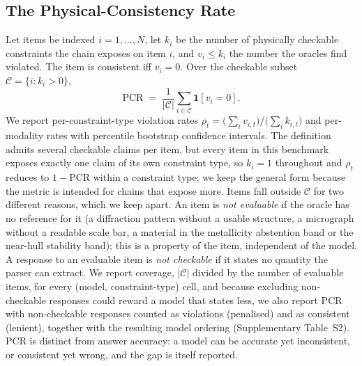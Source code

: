 \documentclass[pdflatex,sn-nature]{sn-jnl}
\newcommand{\rev}[1]{#1}
\newcommand{\rev}[1]{{\color{blue}#1}}
\begin{document}
\subsection*{The Physical-Consistency Rate}
Let items be indexed $i=1,\dots,N$, let $k_i$ be the number of physically checkable
constraints the chain exposes on item $i$, and $v_i \le k_i$ the number the oracles
find violated. The item is consistent iff $v_i=0$. Over the checkable subset
$\mathcal{C}=\{i:k_i>0\}$,
\begin{equation}
\mathrm{PCR} \;=\; \frac{1}{|\mathcal{C}|}\sum_{i\in\mathcal{C}} \mathbf{1}[v_i = 0].
\end{equation}
We report per-constraint-type violation rates
$\rho_t=\big(\sum_i v_{i,t}\big)/\big(\sum_i k_{i,t}\big)$ and per-modality rates with
percentile bootstrap confidence intervals. The definition admits several checkable claims per
item, but every item in this benchmark exposes exactly one claim of its own constraint type,
so $k_i=1$ throughout and $\rho_t$ reduces to $1-\mathrm{PCR}$ within a constraint type; we
keep the general form because the metric is intended for chains that expose more. \rev{Items fall
outside $\mathcal{C}$ for two different reasons, which we keep apart. An item is \emph{not evaluable} if the
oracle has no reference for it (a diffraction pattern without a usable structure, a micrograph without
a readable scale bar, a material in the metallicity abstention band\rev{ or the near-hull stability band}); this is a property of the item,
independent of the model. A response to an evaluable item is \emph{not checkable} if it states no
quantity the parser can extract. We report coverage, $|\mathcal{C}|$ divided by the number of
evaluable items, for every (model, constraint-type) cell, and because excluding non-checkable responses
could reward a model that states less, we also report PCR with non-checkable responses counted as
violations (penalised) and as consistent (lenient), together with the resulting model ordering
(Supplementary Table~S2).} PCR is distinct from answer accuracy: a
model can be accurate yet inconsistent, or consistent yet wrong, and the gap is
itself reported.
\end{document}
